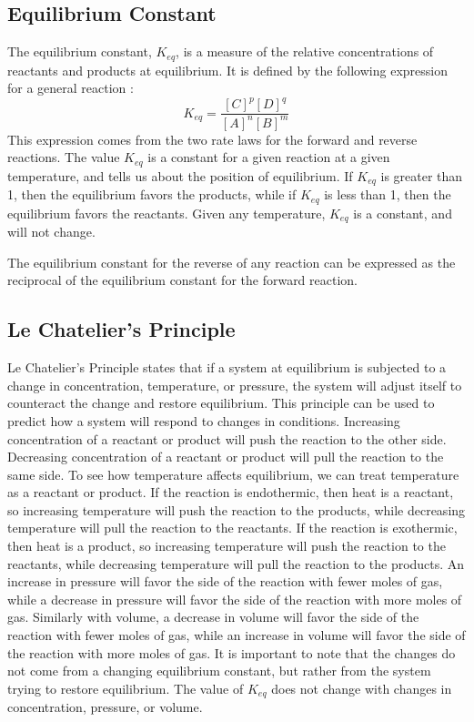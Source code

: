 \subsection{Equilibrium Constant}
The equilibrium constant, $K_{eq}$, is a measure of the relative concentrations of reactants and products at equilibrium. It is defined by the following expression for a general reaction :
\begin{equation}\label{eq:Keq}
    K_{eq} = \frac{[C]^p[D]^q}{[A]^n[B]^m}
\end{equation}
This expression comes from the two rate laws for the forward and reverse reactions. The value $K_{eq}$ is a constant for a given reaction at a given temperature, and tells us about the position of equilibrium. If $K_{eq}$ is greater than 1, then the equilibrium favors the products, while if $K_{eq}$ is less than 1, then the equilibrium favors the reactants. Given any temperature, $K_{eq}$ is a constant, and will not change. 

The equilibrium constant for the reverse of any reaction can be expressed as the reciprocal of the equilibrium constant for the forward reaction. 

\subsection{Le Chatelier's Principle}
Le Chatelier's Principle states that if a system at equilibrium is subjected to a change in concentration, temperature, or pressure, the system will adjust itself to counteract the change and restore equilibrium. This principle can be used to predict how a system will respond to changes in conditions. Increasing concentration of a reactant or product will push the reaction to the other side. Decreasing concentration of a reactant or product will pull the reaction to the same side. To see how temperature affects equilibrium, we can treat temperature as a reactant or product. If the reaction is endothermic, then heat is a reactant, so increasing temperature will push the reaction to the products, while decreasing temperature will pull the reaction to the reactants. If the reaction is exothermic, then heat is a product, so increasing temperature will push the reaction to the reactants, while decreasing temperature will pull the reaction to the products. An increase in pressure will favor the side of the reaction with fewer moles of gas, while a decrease in pressure will favor the side of the reaction with more moles of gas. Similarly with volume, a decrease in volume will favor the side of the reaction with fewer moles of gas, while an increase in volume will favor the side of the reaction with more moles of gas. It is important to note that the changes do not come from a changing equilibrium constant, but rather from the system trying to restore equilibrium. The value of $K_{eq}$ does not change with changes in concentration, pressure, or volume.

